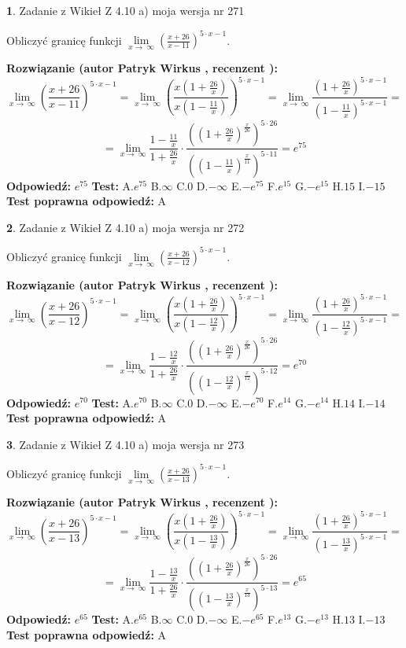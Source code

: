 \documentclass[12pt, a4paper]{article}
\theoremstyle{definition} %
\newtheorem{zad}{}
\newcommand{\zadStart}[1]{\begin{zad}#1\newline}
\newcommand{\zadStop}{\end{zad}}
\newcommand{\rozwStart}[2]{\noindent \textbf{Rozwiązanie (autor #1 , recenzent #2): }\newline}
\newcommand{\rozwStop}{\newline}
\newcommand{\odpStart}{\noindent \textbf{Odpowiedź:}\newline}
\newcommand{\odpStop}{\newline}
\newcommand{\testStart}{\noindent \textbf{Test:}\newline}
\newcommand{\testStop}{\newline}
\newcommand{\kluczStart}{\noindent \textbf{Test poprawna odpowiedź:}\newline}
\newcommand{\kluczStop}{\newline}
\begin{document}
\zadStart{Zadanie z Wikieł Z 4.10 a) moja wersja nr 271}

Obliczyć granicę funkcji  $\lim\limits_{x\to\ \infty}(\frac{x+26}{x-11})^{5\cdot x-1}$.
\zadStop
\rozwStart{Patryk Wirkus}{}
$$\lim\limits_{x\to\ \infty}(\frac{x+26}{x-11})^{5\cdot x-1} = \lim\limits_{x\to\ \infty}(\frac{x(1+\frac{26}{x})}{x(1-\frac{11}{x})})^{5\cdot x-1}=\lim\limits_{x\to\ \infty}\frac{(1+\frac{26}{x})^{5\cdot x-1}}{(1-\frac{11}{x})^{5\cdot x-1}}=$$
$$=\lim\limits_{x\to\ \infty}\frac{1-\frac{11}{x}}{1+\frac{26}{x}}\cdot\frac{((1+\frac{26}{x})^{\frac{x}{26}})^{5\cdot26}}{((1-\frac{11}{x})^{\frac{x}{11}})^{5\cdot11}}=e^{75}$$
\rozwStop
\odpStart
$e^{75}$
\odpStop
\testStart
A.$e^{75}$ B.$\infty$ C.$0$ D.$-\infty$ E.$-e^{75}$
F.$e^{15}$ G.$-e^{15}$
H.$15$
I.$-15$
\testStop
\kluczStart
A
\kluczStop



\zadStart{Zadanie z Wikieł Z 4.10 a) moja wersja nr 272}

Obliczyć granicę funkcji  $\lim\limits_{x\to\ \infty}(\frac{x+26}{x-12})^{5\cdot x-1}$.
\zadStop
\rozwStart{Patryk Wirkus}{}
$$\lim\limits_{x\to\ \infty}(\frac{x+26}{x-12})^{5\cdot x-1} = \lim\limits_{x\to\ \infty}(\frac{x(1+\frac{26}{x})}{x(1-\frac{12}{x})})^{5\cdot x-1}=\lim\limits_{x\to\ \infty}\frac{(1+\frac{26}{x})^{5\cdot x-1}}{(1-\frac{12}{x})^{5\cdot x-1}}=$$
$$=\lim\limits_{x\to\ \infty}\frac{1-\frac{12}{x}}{1+\frac{26}{x}}\cdot\frac{((1+\frac{26}{x})^{\frac{x}{26}})^{5\cdot26}}{((1-\frac{12}{x})^{\frac{x}{12}})^{5\cdot12}}=e^{70}$$
\rozwStop
\odpStart
$e^{70}$
\odpStop
\testStart
A.$e^{70}$ B.$\infty$ C.$0$ D.$-\infty$ E.$-e^{70}$
F.$e^{14}$ G.$-e^{14}$
H.$14$
I.$-14$
\testStop
\kluczStart
A
\kluczStop



\zadStart{Zadanie z Wikieł Z 4.10 a) moja wersja nr 273}

Obliczyć granicę funkcji  $\lim\limits_{x\to\ \infty}(\frac{x+26}{x-13})^{5\cdot x-1}$.
\zadStop
\rozwStart{Patryk Wirkus}{}
$$\lim\limits_{x\to\ \infty}(\frac{x+26}{x-13})^{5\cdot x-1} = \lim\limits_{x\to\ \infty}(\frac{x(1+\frac{26}{x})}{x(1-\frac{13}{x})})^{5\cdot x-1}=\lim\limits_{x\to\ \infty}\frac{(1+\frac{26}{x})^{5\cdot x-1}}{(1-\frac{13}{x})^{5\cdot x-1}}=$$
$$=\lim\limits_{x\to\ \infty}\frac{1-\frac{13}{x}}{1+\frac{26}{x}}\cdot\frac{((1+\frac{26}{x})^{\frac{x}{26}})^{5\cdot26}}{((1-\frac{13}{x})^{\frac{x}{13}})^{5\cdot13}}=e^{65}$$
\rozwStop
\odpStart
$e^{65}$
\odpStop
\testStart
A.$e^{65}$ B.$\infty$ C.$0$ D.$-\infty$ E.$-e^{65}$
F.$e^{13}$ G.$-e^{13}$
H.$13$
I.$-13$
\testStop
\kluczStart
A
\kluczStop
\end{document}

